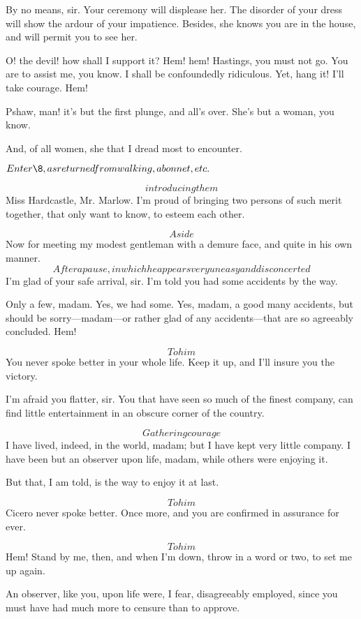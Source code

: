 \documentclass{book}
\begin{document}
\9  By no means, sir.  Your ceremony will displease her. 
The disorder of your dress will show the ardour of your impatience. 
Besides, she knows you are in the house, and will permit you to see
her.

\2  O! the devil! how shall I support it?  Hem! hem!  Hastings,
you must not go.  You are to assist me, you know.  I shall be
confoundedly ridiculous.  Yet, hang it!  I'll take courage.  Hem!

\4  Pshaw, man! it's but the first plunge, and all's over. 
She's but a woman, you know.

\2  And, of all women, she that I dread most to encounter.


\(Enter \8, as returned from walking, a bonnet, etc.\)


\4  \[introducing them\]  Miss Hardcastle, Mr. Marlow.  I'm
proud of bringing two persons of such merit together, that only want to
know, to esteem each other.

\8  \[Aside\]  Now for meeting my modest gentleman with a
demure face, and quite in his own manner.  \[After a pause, in which he
appears very uneasy and disconcerted\]  I'm glad of your safe arrival,
sir.  I'm told you had some accidents by the way.

\2  Only a few, madam.  Yes, we had some.  Yes, madam, a good many
accidents, but should be sorry---madam---or rather glad of any
accidents---that are so agreeably concluded.  Hem!

\4  \[To him\]  You never spoke better in your whole life.  Keep
it up, and I'll insure you the victory.

\8  I'm afraid you flatter, sir.  You that have seen so
much of the finest company, can find little entertainment in an obscure
corner of the country.

\2  \[Gathering courage\]  I have lived, indeed, in the world,
madam; but I have kept very little company.  I have been but an
observer upon life, madam, while others were enjoying it.

\9  But that, I am told, is the way to enjoy it at last.

\4  \[To him\]  Cicero never spoke better.  Once more, and you
are confirmed in assurance for ever.

\2  \[To him\]  Hem!  Stand by me, then, and when I'm down, throw
in a word or two, to set me up again.

\8  An observer, like you, upon life were, I fear,
disagreeably employed, since you must have had much more to censure
than to approve.
\end{document}

